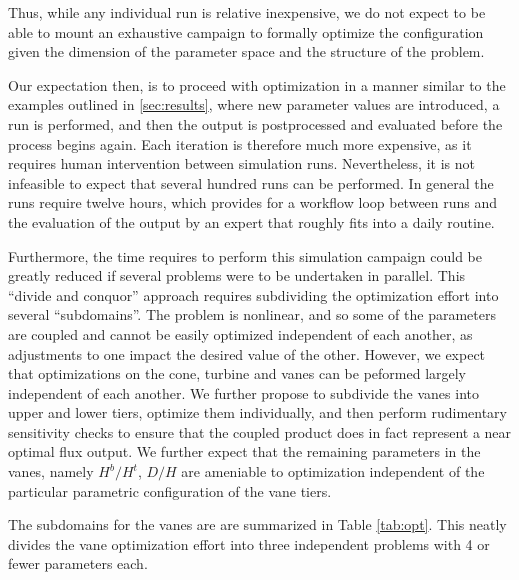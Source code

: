Thus, while any individual run is relative inexpensive, we do not expect
to be able to mount an exhaustive campaign to formally optimize the
configuration given the dimension of the parameter space and the
structure of the problem. 

%
%
Our expectation then, is to proceed with optimization in a manner
similar to the examples outlined in \ref{sec:results}, where new
parameter values are introduced, a run is performed, and then the output
is postprocessed and evaluated before the process begins again. Each
iteration is therefore much more expensive, as it requires human
intervention between simulation runs. Nevertheless, it is not infeasible
to expect that several hundred runs can be performed. In general the
runs require twelve hours, which provides for a workflow loop between
runs and the evaluation of the output by an expert that roughly fits
into a daily routine.

Furthermore, the time requires to perform this simulation campaign could
be greatly reduced if several problems were to be undertaken in
parallel. This ``divide and conquor'' approach requires subdividing the
optimization effort into several ``subdomains''. 
The problem is nonlinear, and so some of the parameters are coupled and
cannot be easily optimized independent of each another, as adjustments
to one impact the desired value of the other. However, we expect that
optimizations on the cone, turbine and vanes can be peformed largely
independent of each another. We further propose to subdivide the vanes
into upper and lower tiers, optimize them individually, and then perform
rudimentary sensitivity checks to ensure that the coupled product does
in fact represent a near optimal flux output. We further expect that the
remaining parameters in the vanes, namely $H^b/H^t$, $D/H$ are ameniable
to optimization independent of the particular parametric configuration
of the vane tiers. 

The subdomains for the vanes are are summarized in Table
\ref{tab:opt}. This neatly divides the vane optimization effort into
three independent problems with 4 or fewer parameters each.

